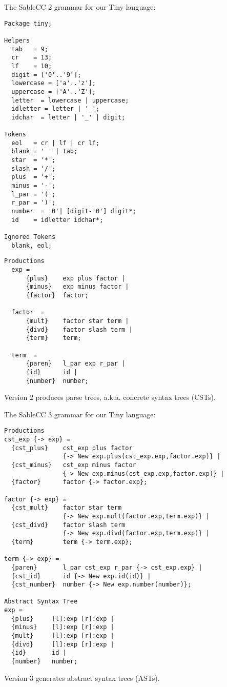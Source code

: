\begin{slide*}
The SableCC 2 grammar for our Tiny language:
\begin{scriptsize}
\begin{verbatim}
Package tiny;

Helpers
  tab   = 9;
  cr    = 13;
  lf    = 10;
  digit = ['0'..'9'];
  lowercase = ['a'..'z'];
  uppercase = ['A'..'Z'];
  letter  = lowercase | uppercase;
  idletter = letter | '_';
  idchar  = letter | '_' | digit;

Tokens
  eol   = cr | lf | cr lf;
  blank = ' ' | tab;
  star  = '*';
  slash = '/';
  plus  = '+';
  minus = '-';
  l_par = '(';
  r_par = ')';
  number  = '0'| [digit-'0'] digit*;
  id    = idletter idchar*;

Ignored Tokens
  blank, eol;
\end{verbatim}
\end{scriptsize}
\vfil
\end{slide*}

\begin{slide*}
\begin{scriptsize}
\begin{verbatim}
Productions
  exp = 
      {plus}    exp plus factor |
      {minus}   exp minus factor |
      {factor}  factor;

  factor  =
      {mult}    factor star term |
      {divd}    factor slash term |
      {term}    term;

  term  =
      {paren}   l_par exp r_par |
      {id}      id |
      {number}  number;
\end{verbatim}
\end{scriptsize}
Version 2 produces parse trees, a.k.a. concrete syntax trees (CSTs).
\vfil
\end{slide*}

\begin{slide*}
The SableCC 3 grammar for our Tiny language:
\begin{scriptsize}
\begin{verbatim}
Productions
cst_exp {-> exp} = 
  {cst_plus}    cst_exp plus factor 
                {-> New exp.plus(cst_exp.exp,factor.exp)} |
  {cst_minus}   cst_exp minus factor 
                {-> New exp.minus(cst_exp.exp,factor.exp)} |
  {factor}      factor {-> factor.exp};

factor {-> exp} =
  {cst_mult}    factor star term 
                {-> New exp.mult(factor.exp,term.exp)} |
  {cst_divd}    factor slash term 
                {-> New exp.divd(factor.exp,term.exp)} |
  {term}        term {-> term.exp};

term {-> exp} =
  {paren}       l_par cst_exp r_par {-> cst_exp.exp} |
  {cst_id}      id {-> New exp.id(id)} |
  {cst_number}  number {-> New exp.number(number)};

Abstract Syntax Tree
exp = 
  {plus}     [l]:exp [r]:exp |
  {minus}    [l]:exp [r]:exp |
  {mult}     [l]:exp [r]:exp |
  {divd}     [l]:exp [r]:exp |
  {id}       id |
  {number}   number;
\end{verbatim}
\end{scriptsize}
Version 3 generates abstract syntax trees (ASTs).
\vfil
\end{slide*}

